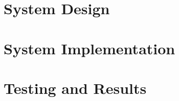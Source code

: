 \documentclass[12pt]{article}
\begin{document}

\newpage

\doublespacing

\tableofcontents %
\newpage

\begin{small} %
\listoffigures %
\end{small}
\newpage 



\newpage



\newpage

\newpage
\section{System Design}


\newpage
\section{System Implementation}














\newpage 
\section{Testing and Results}




\end{document}
